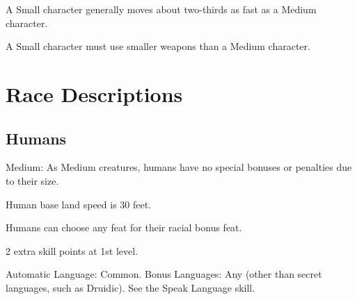 A Small character generally moves about two-thirds as fast as a Medium character.

A Small character must use smaller weapons than a Medium character.

\section{Race Descriptions}

\subsection{Humans}
\begin{itemize*}
\item Medium: As Medium creatures, humans have no special bonuses or penalties due to their size.
\item Human base land speed is 30 feet.
\item Humans can choose any feat for their racial bonus feat.
\item 2 extra skill points at 1st level.
\item Automatic Language: Common. Bonus Languages: Any (other than secret languages, such as Druidic). See the Speak Language skill.
\end{itemize*}

